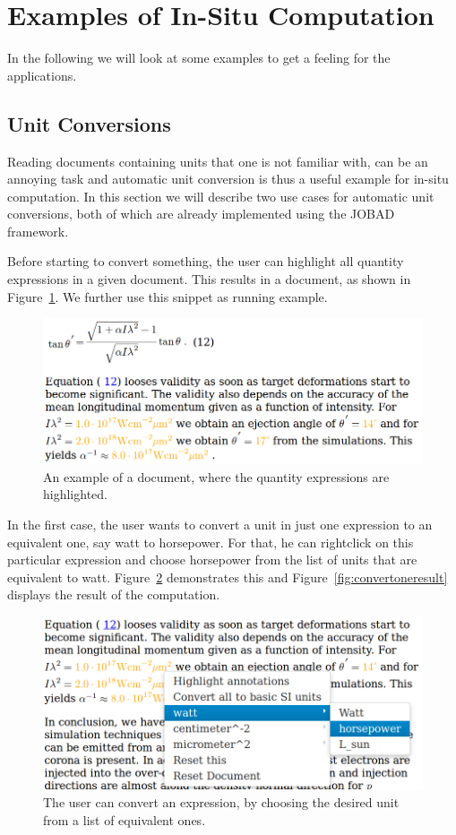 \section{Examples of In-Situ Computation}\label{sec:examples}

In the following we will look at some examples to get a feeling for the applications.
\subsection{Unit Conversions}\label{sec:units}
Reading documents containing units that one is not familiar with, can be an annoying task and
automatic unit conversion is thus a useful example for in-situ computation. 
In this section we will describe two use cases for automatic unit conversions, both of which
are already implemented using the JOBAD framework.

Before starting to convert something, the user can highlight all quantity
expressions in a given document. This results in a document, as shown in
Figure~\ref{fig:highlight}. We further use this snippet as running example.

\begin{figure}
\includegraphics[scale=0.3]{screenshots/highlight.png}
\caption{An example of a document, where the quantity expressions are highlighted.}
\label{fig:highlight}
\end{figure}

In the first case, the user wants to convert a unit in just one expression to
an equivalent one, say watt to horsepower. For that, he can rightclick on this
particular expression and choose horsepower from the list of units that are
equivalent to watt. Figure~\ref{fig:convertone} demonstrates this and
Figure~\ref{fig:convertoneresult} displays the result of the computation. 

\begin{figure}
\includegraphics[scale=0.3]{screenshots/convertone.png}
\caption{The user can convert an expression, by choosing the desired
unit from a list of equivalent ones.}
\label{fig:convertone}
\end{figure}

